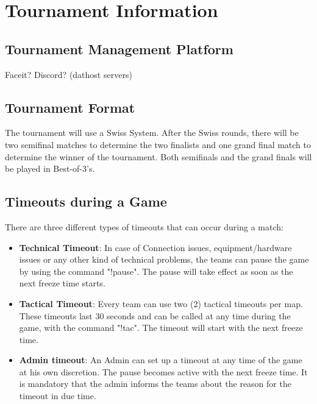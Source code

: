 \documentclass{article}
\begin{document}
\section{Tournament Information}


\subsection{Tournament Management Platform}
Faceit?
Discord? (dathost servers)


\subsection{Tournament Format}
The tournament will use a Swiss System. After the Swiss rounds, there will be two semifinal matches to determine the two finalists and 
one grand final match to determine the winner of the tournament. Both semifinals and the grand finals will be played in Best-of-3's.

\subsection{Timeouts during a Game}
There are three different types of timeouts that can occur during a match:

\begin{itemize}
    \item \textbf{Technical Timeout}: In case of Connection issues, equipment/hardware issues or any other kind of technical problems, the teams can pause the game by using the command "!pause". The pause will take effect as soon as the next freeze time starts.
    \item \textbf{Tactical Timeout}: Every team can use two (2) tactical timeouts per map. These timeouts last 30 seconds and can be called at any time during the game, with the command "!tac". The timeout will start with the next freeze time.
    \item \textbf{Admin timeout}: An Admin can set up a timeout at any time of the game at his own discretion. The pause becomes active with the next freeze time. It is mandatory that the admin informs the teams about the reason for the timeout in due time.
\end{itemize}
\end{document}
